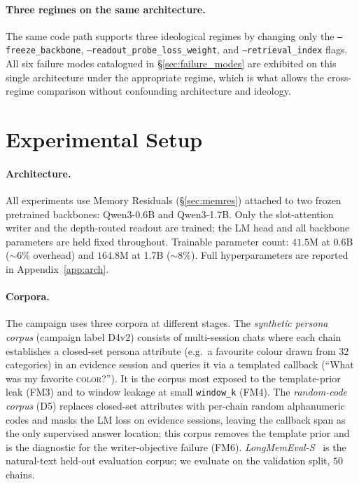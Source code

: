 \documentclass{article}
\begin{document}
\paragraph{Three regimes on the same architecture.}  The same code
path supports three ideological regimes by changing only the
\texttt{--freeze\_backbone}, \texttt{--readout\_probe\_loss\_weight},
and \texttt{--retrieval\_index} flags.  All six failure modes
catalogued in \S\ref{sec:failure_modes} are exhibited on this single
architecture under the appropriate regime, which is what allows the
cross-regime comparison without confounding architecture and ideology.

\section{Experimental Setup}
\label{sec:setup}

\paragraph{Architecture.}  All experiments use Memory Residuals
(\S\ref{sec:memres}) attached to two frozen pretrained backbones:
Qwen3-0.6B and Qwen3-1.7B.  Only the slot-attention writer and the
depth-routed readout are trained; the LM head and all backbone
parameters are held fixed throughout.  Trainable parameter count:
$41.5$M at 0.6B ($\sim\!6\%$ overhead) and $164.8$M at 1.7B
($\sim\!8\%$).  Full hyperparameters are reported in
Appendix~\ref{app:arch}.

\paragraph{Corpora.}  The campaign uses three corpora at different
stages.  The \emph{synthetic persona corpus} (campaign label D4v2)
consists of multi-session chats where each chain establishes a
closed-set persona attribute (e.g.\ a favourite colour drawn from
$32$ categories) in an evidence session and queries it via a
templated callback (``What was my favorite \textsc{color}?'').  It
is the corpus most exposed to the template-prior leak (FM3) and to
window leakage at small \texttt{window\_k} (FM4).  The
\emph{random-code corpus} (D5) replaces closed-set attributes with
per-chain random alphanumeric codes and masks the LM loss on
evidence sessions, leaving the callback span as the only supervised
answer location; this corpus removes the template prior and is the
diagnostic for the writer-objective failure (FM6).
\emph{LongMemEval-S}~\cite{longmemeval2025} is the natural-text
held-out evaluation corpus; we evaluate on the validation split,
$50$ chains.
\end{document}
